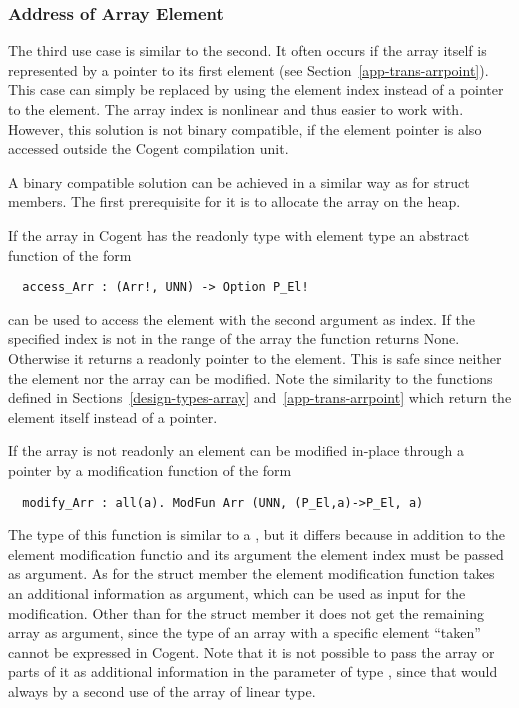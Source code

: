 \subsubsection{Address of Array Element}

The third use case is similar to the second. It often occurs if the array itself is represented by a pointer to its first
element (see Section~\ref{app-trans-arrpoint}). This case can simply be replaced by using the element index instead of a 
pointer to the element. The array index is nonlinear and thus easier to work with. However, this solution is not binary
compatible, if the element pointer is also accessed outside the Cogent compilation unit.

A binary compatible solution can be achieved in a similar way as for struct members. The first prerequisite for it is
to allocate the array on the heap.

If the array in Cogent has the readonly type  with element type  an abstract function of the form
\begin{verbatim}
  access_Arr : (Arr!, UNN) -> Option P_El!
\end{verbatim}
can be used to access the element with the second argument as index.  If the specified index is not in the range of the array the
function returns None. Otherwise it returns a readonly pointer to the element. This is safe 
since neither the element nor the array can be modified. Note the similarity to the  functions defined in
Sections~\ref{design-types-array} and~\ref{app-trans-arrpoint} which return the element itself instead of a pointer.

If the array is not readonly an element can be modified in-place through a pointer by a modification function of the form
\begin{verbatim}
  modify_Arr : all(a). ModFun Arr (UNN, (P_El,a)->P_El, a)
\end{verbatim}
The type of this function is similar to a , but it differs because in addition to the element modification 
functio and its argument the element index must be passed as argument.
As for the struct member the element modification function takes an additional information as argument, which can be
used as input for the modification. Other than for the struct member it does not get the remaining array as argument,
since the type of an array with a specific element ``taken'' cannot be expressed in Cogent. Note that it is not possible
to pass the array or parts of it as additional information in the parameter of type , since that would always by
a second use of the array of linear type.

